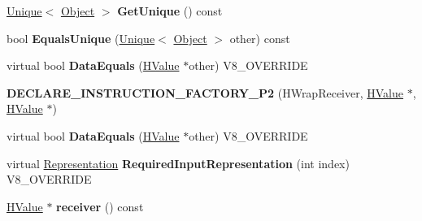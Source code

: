 \begin{DoxyCompactItemize}
\item 
\hypertarget{classv8_1_1internal_1_1_v8___f_i_n_a_l_a032d6bc09bff71bbee5ee2e63ca74b49}{}\hyperlink{classv8_1_1internal_1_1_unique}{Unique}$<$ \hyperlink{classv8_1_1internal_1_1_object}{Object} $>$ {\bfseries Get\+Unique} () const \label{classv8_1_1internal_1_1_v8___f_i_n_a_l_a032d6bc09bff71bbee5ee2e63ca74b49}

\item 
\hypertarget{classv8_1_1internal_1_1_v8___f_i_n_a_l_a693aa132371cb6752b63175feec9baef}{}bool {\bfseries Equals\+Unique} (\hyperlink{classv8_1_1internal_1_1_unique}{Unique}$<$ \hyperlink{classv8_1_1internal_1_1_object}{Object} $>$ other) const \label{classv8_1_1internal_1_1_v8___f_i_n_a_l_a693aa132371cb6752b63175feec9baef}

\item 
\hypertarget{classv8_1_1internal_1_1_v8___f_i_n_a_l_a7f4d45af1c12067191189fb1f32db617}{}virtual bool {\bfseries Data\+Equals} (\hyperlink{classv8_1_1internal_1_1_h_value}{H\+Value} $\ast$other) V8\+\_\+\+O\+V\+E\+R\+R\+I\+D\+E\label{classv8_1_1internal_1_1_v8___f_i_n_a_l_a7f4d45af1c12067191189fb1f32db617}

\item 
\hypertarget{classv8_1_1internal_1_1_v8___f_i_n_a_l_ad1b84a4fda54190c6265fe9b30a87d3d}{}{\bfseries D\+E\+C\+L\+A\+R\+E\+\_\+\+I\+N\+S\+T\+R\+U\+C\+T\+I\+O\+N\+\_\+\+F\+A\+C\+T\+O\+R\+Y\+\_\+\+P2} (H\+Wrap\+Receiver, \hyperlink{classv8_1_1internal_1_1_h_value}{H\+Value} $\ast$, \hyperlink{classv8_1_1internal_1_1_h_value}{H\+Value} $\ast$)\label{classv8_1_1internal_1_1_v8___f_i_n_a_l_ad1b84a4fda54190c6265fe9b30a87d3d}

\item 
\hypertarget{classv8_1_1internal_1_1_v8___f_i_n_a_l_a7f4d45af1c12067191189fb1f32db617}{}virtual bool {\bfseries Data\+Equals} (\hyperlink{classv8_1_1internal_1_1_h_value}{H\+Value} $\ast$other) V8\+\_\+\+O\+V\+E\+R\+R\+I\+D\+E\label{classv8_1_1internal_1_1_v8___f_i_n_a_l_a7f4d45af1c12067191189fb1f32db617}

\item 
\hypertarget{classv8_1_1internal_1_1_v8___f_i_n_a_l_a6c6d1f37f40b113d8f4062f1ffff7215}{}virtual \hyperlink{classv8_1_1internal_1_1_representation}{Representation} {\bfseries Required\+Input\+Representation} (int index) V8\+\_\+\+O\+V\+E\+R\+R\+I\+D\+E\label{classv8_1_1internal_1_1_v8___f_i_n_a_l_a6c6d1f37f40b113d8f4062f1ffff7215}

\item 
\hypertarget{classv8_1_1internal_1_1_v8___f_i_n_a_l_a4bc28b497cf25a9de3cde065b9775575}{}\hyperlink{classv8_1_1internal_1_1_h_value}{H\+Value} $\ast$ {\bfseries receiver} () const \label{classv8_1_1internal_1_1_v8___f_i_n_a_l_a4bc28b497cf25a9de3cde065b9775575}


\end{DoxyCompactItemize}
